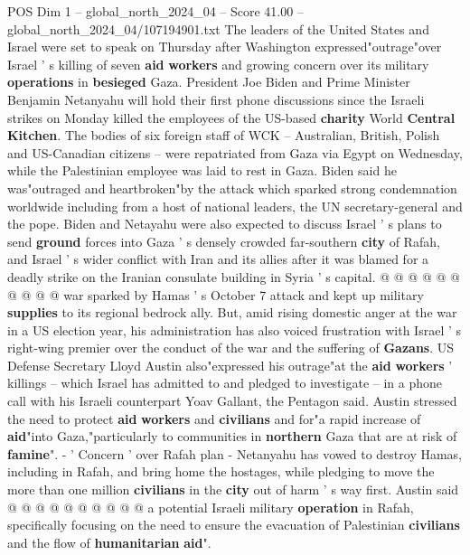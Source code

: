 \begin{textsample}{POS Dim 1 – global\_north\_2024\_04 – Score 41.00 – global\_north\_2024\_04/107194901.txt}  \label{ex:f1_pos_195}
The leaders of the United States and Israel were set to speak on Thursday after Washington expressed"outrage"over Israel ' s killing of seven \textbf{aid} \textbf{workers} and growing concern over its military \textbf{operations} in \textbf{besieged} Gaza.
President Joe Biden and Prime Minister Benjamin Netanyahu will hold their first phone discussions since the Israeli strikes on Monday killed the employees of the US-based \textbf{charity} World \textbf{Central} \textbf{Kitchen}.
The bodies of six foreign staff of WCK -- Australian, British, Polish and US-Canadian citizens -- were repatriated from Gaza via Egypt on Wednesday, while the Palestinian employee was laid to rest in Gaza.
Biden said he was"outraged and heartbroken"by the attack which sparked strong condemnation worldwide including from a host of national leaders, the UN secretary-general and the pope.
Biden and Netayahu were also expected to discuss Israel ' s plans to send \textbf{ground} forces into Gaza ' s densely crowded far-southern \textbf{city} of Rafah, and Israel ' s wider conflict with Iran and its allies after it was blamed for a deadly strike on the Iranian consulate building in Syria ' s capital. @ @ @ @ @ @ @ @ @ @ war sparked by Hamas ' s October 7 attack and kept up military \textbf{supplies} to its regional bedrock ally.
But, amid rising domestic anger at the war in a US election year, his administration has also voiced frustration with Israel ' s right-wing premier over the conduct of the war and the suffering of \textbf{Gazans}.
US Defense Secretary Lloyd Austin also"expressed his outrage"at the \textbf{aid} \textbf{workers} ' killings -- which Israel has admitted to and pledged to investigate -- in a phone call with his Israeli counterpart Yoav Gallant, the Pentagon said.
Austin stressed the need to protect \textbf{aid} \textbf{workers} and \textbf{civilians} and for"a rapid increase of \textbf{aid}"into Gaza,"particularly to communities in \textbf{northern} Gaza that are at risk of \textbf{famine}". - ' Concern ' over Rafah plan - Netanyahu has vowed to destroy Hamas, including in Rafah, and bring home the hostages, while pledging to move the more than one million \textbf{civilians} in the \textbf{city} out of harm ' s way first.
Austin said @ @ @ @ @ @ @ @ @ @ a potential Israeli military \textbf{operation} in Rafah, specifically focusing on the need to ensure the evacuation of Palestinian \textbf{civilians} and the flow of \textbf{humanitarian} \textbf{aid}".

\end{textsample}
